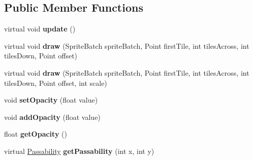 \subsection*{Public Member Functions}
\begin{DoxyCompactItemize}
\item 
\hypertarget{class_simple_r_p_g_1_1_drawable_layer_a0803d17ddf796c736412a3ec9b099bea}{virtual void {\bfseries update} ()}\label{class_simple_r_p_g_1_1_drawable_layer_a0803d17ddf796c736412a3ec9b099bea}

\item 
\hypertarget{class_simple_r_p_g_1_1_drawable_layer_abf1e9fa363dd592d5c01935e46bcd71e}{virtual void {\bfseries draw} (Sprite\-Batch sprite\-Batch, Point first\-Tile, int tiles\-Across, int tiles\-Down, Point offset)}\label{class_simple_r_p_g_1_1_drawable_layer_abf1e9fa363dd592d5c01935e46bcd71e}

\item 
\hypertarget{class_simple_r_p_g_1_1_drawable_layer_af4129d9ebd2e139ccaf2618b0c93e1bb}{virtual void {\bfseries draw} (Sprite\-Batch sprite\-Batch, Point first\-Tile, int tiles\-Across, int tiles\-Down, Point offset, int scale)}\label{class_simple_r_p_g_1_1_drawable_layer_af4129d9ebd2e139ccaf2618b0c93e1bb}

\item 
\hypertarget{class_simple_r_p_g_1_1_drawable_layer_a87911cd99c0a4d379d0c3f1c2f0af84c}{void {\bfseries set\-Opacity} (float value)}\label{class_simple_r_p_g_1_1_drawable_layer_a87911cd99c0a4d379d0c3f1c2f0af84c}

\item 
\hypertarget{class_simple_r_p_g_1_1_drawable_layer_a2267e4b442be555ea7386e83295e832a}{void {\bfseries add\-Opacity} (float value)}\label{class_simple_r_p_g_1_1_drawable_layer_a2267e4b442be555ea7386e83295e832a}

\item 
\hypertarget{class_simple_r_p_g_1_1_drawable_layer_a8891ce4a9e4d5fbfa993cb6b0073dfbf}{float {\bfseries get\-Opacity} ()}\label{class_simple_r_p_g_1_1_drawable_layer_a8891ce4a9e4d5fbfa993cb6b0073dfbf}

\item 
\hypertarget{class_simple_r_p_g_1_1_drawable_layer_adb33676bd4d70ddec74667c74f4e0c0e}{virtual \hyperlink{namespace_simple_r_p_g_a5f1ec21e7f4e36278a6cedd38c51e650}{Passability} {\bfseries get\-Passability} (int x, int y)}\label{class_simple_r_p_g_1_1_drawable_layer_adb33676bd4d70ddec74667c74f4e0c0e}

\end{DoxyCompactItemize}

